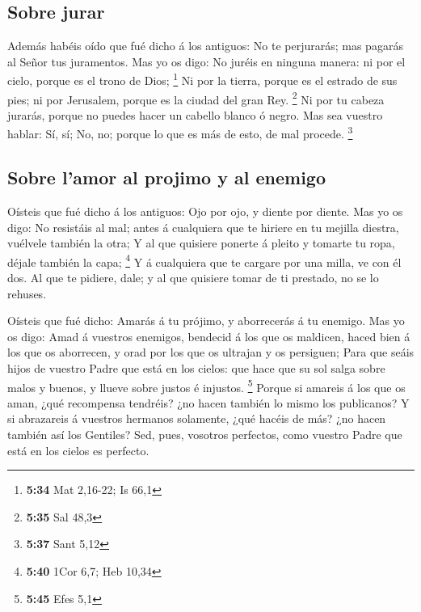\hypertarget{sobre-jurar}{%
\subsection{Sobre jurar}\label{sobre-jurar}}

 Además habéis oído que fué dicho á los antiguos: No te
perjurarás; mas pagarás al Señor tus juramentos.  Mas yo
os digo: No juréis en ninguna manera: ni por el cielo, porque es el
trono de Dios; \footnote{\textbf{5:34} Mat 2,16-22; Is 66,1}
 Ni por la tierra, porque es el estrado de sus pies; ni
por Jerusalem, porque es la ciudad del gran Rey. \footnote{\textbf{5:35}
  Sal 48,3}  Ni por tu cabeza jurarás, porque no puedes
hacer un cabello blanco ó negro.  Mas sea vuestro hablar:
Sí, sí; No, no; porque lo que es más de esto, de mal procede.
\footnote{\textbf{5:37} Sant 5,12}

\hypertarget{sobre-lamor-al-projimo-y-al-enemigo}{%
\subsection{Sobre l'amor al projimo y al
enemigo}\label{sobre-lamor-al-projimo-y-al-enemigo}}

 Oísteis que fué dicho á los antiguos: Ojo por ojo, y
diente por diente.  Mas yo os digo: No resistáis al mal;
antes á cualquiera que te hiriere en tu mejilla diestra, vuélvele
también la otra;  Y al que quisiere ponerte á pleito y
tomarte tu ropa, déjale también la capa; \footnote{\textbf{5:40} 1Cor
  6,7; Heb 10,34}  Y á cualquiera que te cargare por una
milla, ve con él dos.  Al que te pidiere, dale; y al que
quisiere tomar de ti prestado, no se lo rehuses.

 Oísteis que fué dicho: Amarás á tu prójimo, y
aborrecerás á tu enemigo.  Mas yo os digo: Amad á
vuestros enemigos, bendecid á los que os maldicen, haced bien á los que
os aborrecen, y orad por los que os ultrajan y os persiguen;
 Para que seáis hijos de vuestro Padre que está en los
cielos: que hace que su sol salga sobre malos y buenos, y llueve sobre
justos é injustos. \footnote{\textbf{5:45} Efes 5,1} 
Porque si amareis á los que os aman, ¿qué recompensa tendréis? ¿no hacen
también lo mismo los publicanos?  Y si abrazareis á
vuestros hermanos solamente, ¿qué hacéis de más? ¿no hacen también así
los Gentiles?  Sed, pues, vosotros perfectos, como
vuestro Padre que está en los cielos es perfecto.

